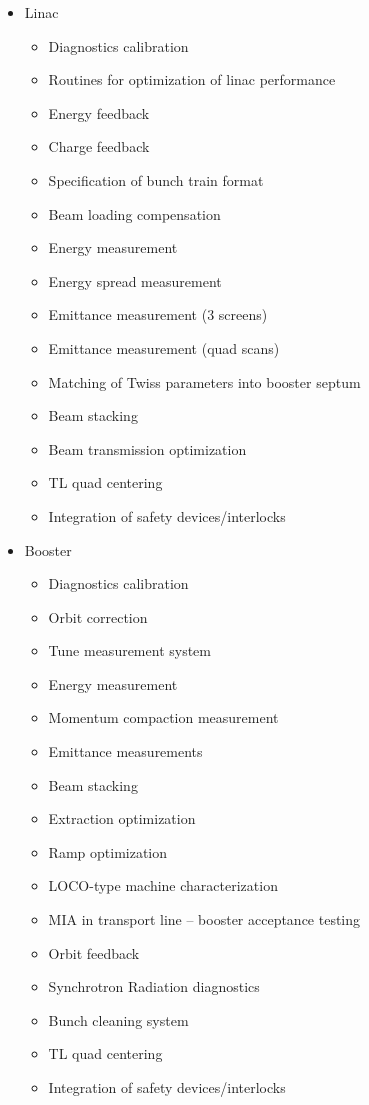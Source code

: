 \documentclass[11pt,oneside,letterpaper,showtrims,article]{memoir}
\begin{document}
\begin{itemize}
\item Linac
\begin{itemize}
\item Diagnostics calibration
\item Routines for optimization of linac performance
\item Energy feedback
\item Charge feedback
\item Specification of bunch train format    
\item Beam loading compensation      
\item Energy measurement     
\item Energy spread measurement      
\item Emittance measurement (3 screens)      
\item Emittance measurement (quad scans)     
\item Matching of Twiss parameters into booster septum       
\item Beam stacking  
\item Beam transmission optimization 
\item TL quad centering      
\item Integration of safety devices/interlocks       
\end{itemize}

\item Booster
\begin{itemize}
\item Diagnostics calibration       
\item Orbit correction       
\item Tune measurement system
\item Energy measurement     
\item Momentum compaction measurement
\item Emittance measurements 
\item Beam stacking  
\item Extraction optimization
\item Ramp optimization      
\item LOCO-type machine characterization     
\item MIA in transport line -- booster acceptance testing
\item Orbit feedback 
\item Synchrotron Radiation diagnostics      
\item Bunch cleaning system  
\item TL quad centering      
\item Integration of safety devices/interlocks       
\end{itemize} 


\end{itemize}
\end{document}
